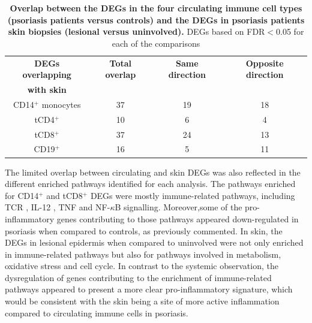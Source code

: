  

\begin{table}[htbp]
\centering
\begin{tabular}{@{} c c c c}
\toprule
\textbf{DEGs overlapping}   & \textbf{Total overlap}   & \textbf{Same direction}  & \textbf{Opposite direction}\\
\textbf{with skin}          &                          &                          &                            \\
\midrule 
\midrule
CD14$^+$ monocytes          & 37                       & 19                       &  18                         \\ 
tCD4$^+$                     & 10                       & 6                        &  4                           \\
tCD8$^+$                     & 37                       & 24                       &  13                           \\
CD19$^+$                    & 16                       & 5                        &  11                          \\
\bottomrule 
\end{tabular}
\medskip %
\caption[Overlap between the DEGs in the four circulating immune cell types (psoriasis patients versus controls) and the DEGs in psoriasis patients skin biopsies (lesional versus uninvolved).]{\textbf{Overlap between the DEGs in the four circulating immune cell types (psoriasis patients versus controls) and the DEGs in psoriasis patients skin biopsies (lesional versus uninvolved).} DEGs based on FDR$<$0.05 for each of the comparisons} 
\label{tab:RNAseq_overlap_circulating_versus_skin}
\end{table}
\bigskip %


The limited overlap between circulating and skin DEGs was also reflected in the different enriched pathways identified for each analysis. The pathways enriched for CD14$^+$ and tCD8$^+$ DEGs were mostly immune-related pathways, including TCR , IL-12 , TNF and NF-$\kappa$B signalling. Moreover,some of the pro-inflammatory genes contributing to those pathways appeared down-regulated in psoriasis when compared to controls, as previously commented.%
In skin, the DEGs in lesional epidermis when compared to uninvolved were not only enriched in immune-related pathways but also for pathways involved in metabolism, oxidative stress and cell cycle. In contrast to the systemic observation, the dysregulation of genes contributing to the enrichment of immune-related pathways appeared to present a more clear pro-inflammatory signature, which would be consistent with the skin being a site of more active inflammation compared to circulating immune cells in psoriasis.


